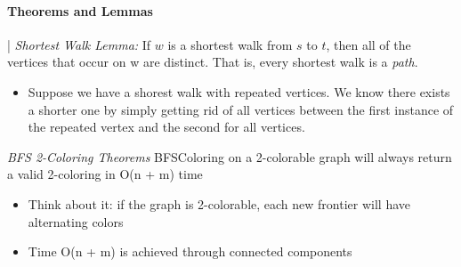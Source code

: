 \documentclass{article}
\begin{document}
\paragraph*{Theorems and Lemmas} |
\newline
\newline
\emph{Shortest Walk Lemma: } If $w$ is a shortest walk from $s$ to $t$, then all of the vertices that occur on w are distinct.
That is, every shortest walk is a \emph{path}.
\begin{itemize}
  \item Suppose we have a shorest walk with repeated vertices. We know there exists a shorter one
  by simply getting rid of all vertices between the first instance of the repeated vertex and the second
  for all vertices.
\end{itemize}
\emph{BFS 2-Coloring Theorems} BFSColoring on a 2-colorable graph will always return a valid 2-coloring in O(n + m) time
\begin{itemize}
  \item Think about it: if the graph is 2-colorable, each new frontier will have alternating colors
  \item Time O(n + m) is achieved through connected components 
\end{itemize}
\end{document}
